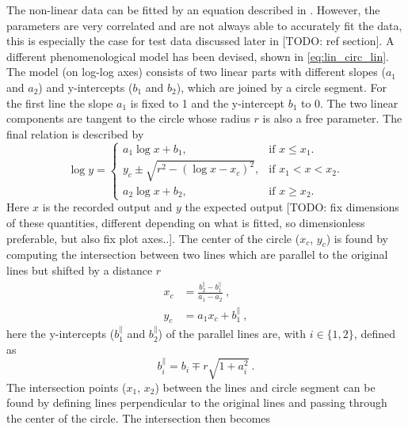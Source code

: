 The non-linear data can be fitted by an equation described in \cite{icecube2010pmt}. However, the parameters are very correlated and are not always able to accurately fit the data, this is especially the case for test data discussed later in [TODO: ref \kascade section]. A different phenomenological model has been devised, shown in \ref{eq:lin_circ_lin}. The model (on log-log axes) consists of two linear parts with different slopes ($a_1$ and $a_2$) and y-intercepts ($b_1$ and $b_2$), which are joined by a circle segment. For the first line the slope $a_1$ is fixed to 1 and the y-intercept $b_1$ to 0. The two linear components are tangent to the circle whose radius $r$ is also a free parameter. The final relation is described by
%
\begin{equation}
\label{eq:lin_circ_lin}
    \log y =
    \begin{cases}
        a_1 \log x + b_1,                     & \text{if $x \leq x_1$}.\\
        y_c \pm \sqrt{r^2 - \left(\log x - x_c\right)^2}, & \text{if $x_1 < x < x_2$}.\\
        a_2 \log x + b_2,                     & \text{if $x \geq x_2$}.
    \end{cases}
\end{equation}
%
Here $x$ is the recorded output and $y$ the expected output [TODO: fix dimensions of these quantities, different depending on what is fitted, so dimensionless preferable, but also fix plot axes..]. The center of the circle ($x_c$, $y_c$) is found by computing the intersection between two lines which are parallel to the original lines but shifted by a distance $r$
%
\begin{equation}
    \begin{aligned}
    x_c &= \frac{b^{\parallel}_2 - b^{\parallel}_1}{a_1 - a_2} \ ,\\
    y_c &= a_1 x_c + b^{\parallel}_1 \ ,
    \end{aligned}
\end{equation}
%
here the y-intercepts ($b^{\parallel}_1$ and $b^{\parallel}_2$) of the parallel lines are, with $i \in \{1, 2\}$, defined as
%
\begin{equation}
    b^{\parallel}_i = b_i \mp r \sqrt{1 + a_i^2} \ .
\end{equation}
%
The intersection points ($x_1$, $x_2$) between the lines and circle segment can be found by defining lines perpendicular to the original lines and passing through the center of the circle. The intersection then becomes
